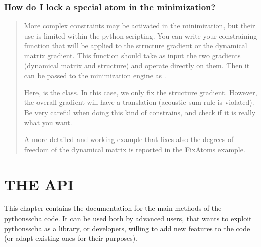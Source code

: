 \documentclass[a4paper,11pt,english]{sphinxmanual}
\begin{document}
\subsection{How do I lock a special atom in the minimization?}
\label{\detokenize{faq:how-do-i-lock-a-special-atom-in-the-minimization}}\begin{quote}

\sphinxAtStartPar
More complex constraints may be activated in the minimization, but their use is limited within the python scripting.
You can write your constraining function that will be applied to the structure gradient or the dynamical matrix gradient.
This function should take as input the two gradients (dynamical matrix and structure) and operate directly on them.
Then it can be passed to the minimization engine as .

\begin{sphinxVerbatim}[commandchars=\\\{\}]
  \PYG{p}{[}  \PYG{p}{]}
  
    \PYG{p}{[} \PYG{p}{]}  

    
\end{sphinxVerbatim}

\sphinxAtStartPar
Here,  is the  class. In this case, we only fix the structure gradient. However, the overall gradient will have a translation (acoustic sum rule is violated). Be very careful when doing this kind of constrains, and check if it is really what you want.

\sphinxAtStartPar
A more detailed and working example that fixes also the degrees of freedom of the dynamical matrix is reported in the FixAtoms example.
\end{quote}

\sphinxstepscope


\chapter{THE API}
\label{\detokenize{apireference:the-api}}\label{\detokenize{apireference::doc}}
\sphinxAtStartPar
This chapter contains the documentation for the main methods of the python\sphinxhyphen{}sscha code.
It can be used both by advanced users, that wants to exploit python\sphinxhyphen{}sscha as a library,
or developers, willing to add new features to the code (or adapt existing ones for their purposes).
\end{document}
